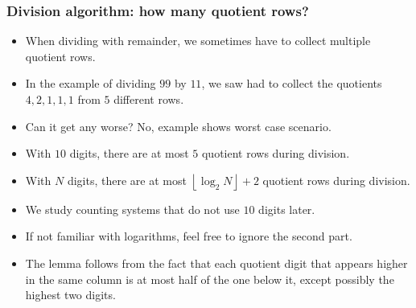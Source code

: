 \begin{frame}
\frametitle{Division algorithm: how many quotient rows?}
\begin{itemize}
\item When dividing with remainder, we sometimes have to collect multiple quotient rows.
\item In the example of dividing $99$ by $11$, we saw had to collect the quotients $4,2,1,1,1$ from $5$ different rows.
\item Can it get any worse? No, example shows worst case scenario.
\end{itemize}
\begin{lemma}
\begin{itemize}
\item With $10$ digits, there are at most $5$ quotient rows during division.
\item \color{gray} With $N$ digits, there are at most $\left\lfloor \log_2 N\right\rfloor + 2$ quotient rows during division.
\end{itemize}
\end{lemma}
\begin{itemize}
\item We study counting systems that do not use $10$ digits later.
\item If not familiar with logarithms, feel free to ignore the second part.
\item The lemma follows from the fact that each quotient digit that appears higher in the same column is at most half of the one below it, except possibly the highest two digits.
\end{itemize}

\end{frame}

